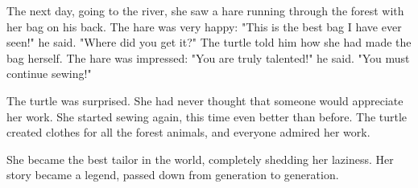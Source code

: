 {The next day, going to the river, she saw a hare running through the forest with her bag on his back. The hare was very happy: "This is the best bag I have ever seen!" he said. "Where did you get it?" The turtle told him how she had made the bag herself. The hare was impressed: "You are truly talented!" he said. "You must continue sewing!" 

The turtle was surprised. She had never thought that someone would appreciate her work. She started sewing again, this time even better than before. The turtle created clothes for all the forest animals, and everyone admired her work. 

She became the best tailor in the world, completely shedding her laziness. Her story became a legend, passed down from generation to generation.
}
